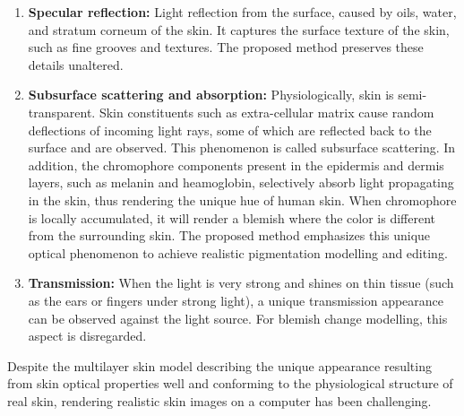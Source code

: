 \begin{spacing}{1.5}
\begin{enumerate}
    \item \textbf{Specular reflection:} Light reflection from the surface, caused by oils, water, and stratum corneum of the skin. It captures the surface texture of the skin, such as fine grooves and textures. The proposed method preserves these details unaltered.
    \item \textbf{Subsurface scattering and absorption:} Physiologically, skin is semi-transparent\cite{Igarashi2005TheAO}. Skin constituents such as extra-cellular matrix cause random deflections of incoming light rays, some of which are reflected back to the surface and are observed. This phenomenon is called subsurface scattering. In addition, the chromophore components present in the epidermis and dermis layers, such as melanin and heamoglobin, selectively absorb light propagating in the skin, thus rendering the unique hue of human skin. When chromophore is locally accumulated, it will render a blemish where the color is different from the surrounding skin\cite{ANDERSON198113}. The proposed method emphasizes this unique optical phenomenon to achieve realistic pigmentation modelling and editing.
    \item \textbf{Transmission:} When the light is very strong and shines on thin tissue (such as the ears or fingers under strong light), a unique transmission appearance can be observed against the light source. For blemish change modelling, this aspect is disregarded.
\end{enumerate}

Despite the multilayer skin model describing the unique appearance resulting from skin optical properties well and conforming to the physiological structure of real skin, rendering realistic skin images on a computer has been challenging. 


\end{spacing}
